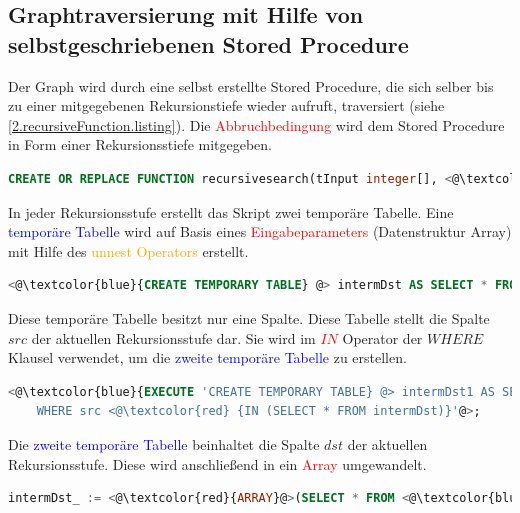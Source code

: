 \subsection{Graphtraversierung mit Hilfe von selbstgeschriebenen Stored Procedure}
\label{2.postgresRecursiveFunction.subsection}
Der Graph wird durch eine selbst erstellte Stored Procedure, die sich selber bis zu einer mitgegebenen Rekursionstiefe wieder aufruft, traversiert (siehe \ref{2.recursiveFunction.listing}).
Die \textcolor{red}{Abbruchbedingung} wird dem Stored Procedure in Form einer Rekursionsstiefe mitgegeben.
\begin{lstlisting}[language=SQL,caption = Abbruchbedingung recursiveSearch,frame=single, label={2.AbbruchbedingungRecursiveSearch.listing} ]
    CREATE OR REPLACE FUNCTION recursivesearch(tInput integer[], <@\textcolor{red}{iRecursionDepth integer} @>, sTable text) RETURNS SETOF integer AS
\end{lstlisting}
In jeder Rekursionsstufe erstellt das Skript zwei temporäre Tabelle.
Eine \textcolor{blue}{temporäre Tabelle} wird auf Basis eines \textcolor{red}{Eingabeparameters} (Datenstruktur Array) mit Hilfe des \textcolor{orange}{unnest Operators} erstellt.
\begin{lstlisting}[language=SQL,caption = Signatur recursiveSearch,frame=single, label={2.AbbruchbedingungRecursiveSearch.listing} ]
    <@\textcolor{blue}{CREATE TEMPORARY TABLE} @> intermDst AS SELECT * FROM <@\textcolor{orange} {unnest} @> <@\textcolor{red}{(tInput)}@>;
\end{lstlisting}
Diese temporäre Tabelle besitzt nur eine Spalte.
Diese Tabelle stellt die Spalte $src$ der aktuellen Rekursionsstufe dar.
Sie wird im \textcolor{red}{$IN$} Operator der $WHERE$ Klausel verwendet, um die \textcolor{blue}{zweite temporäre Tabelle} zu erstellen.
\begin{lstlisting}[language=SQL,caption = Erstellen 2. temporäre Tabelle,frame=single, label={2.AbbruchbedingungRecursiveSearch.listing} ]
    <@\textcolor{blue}{EXECUTE 'CREATE TEMPORARY TABLE} @> intermDst1 AS SELECT DISTINCT(dst) FROM ' || sTable || '
    WHERE src <@\textcolor{red} {IN (SELECT * FROM intermDst)}'@>;
\end{lstlisting}
Die \textcolor{blue}{zweite temporäre Tabelle} beinhaltet die Spalte $dst$ der aktuellen Rekursionsstufe.
Diese wird anschließend in ein \textcolor{red}{Array} umgewandelt.
\begin{lstlisting}[language=SQL,caption = Erstellen des Aufrufarray,frame=single, label={2.AbbruchbedingungRecursiveSearch.listing} ]
    intermDst_ := <@\textcolor{red}{ARRAY}@>(SELECT * FROM <@\textcolor{blue}{intermDst1}@>);
\end{lstlisting}
